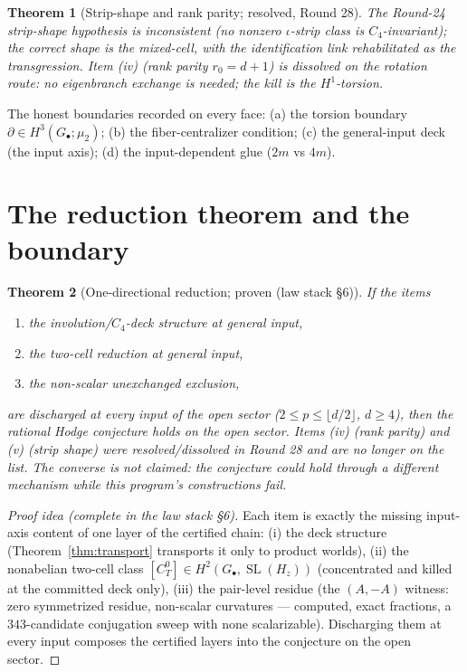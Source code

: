\documentclass[11pt]{article}
\newtheorem{theorem}{Theorem}[section]
\begin{document}
\begin{theorem}[Strip-shape and rank parity; resolved, Round 28]
The Round-24 strip-shape hypothesis is inconsistent (no nonzero
$\iota$-strip class is $C_4$-invariant); the correct shape is the
mixed-cell, with the identification link rehabilitated as the
transgression. Item (iv) (rank parity $r_0=d+1$) is dissolved on the
rotation route: no eigenbranch exchange is needed; the kill is the
$H^1$-torsion.
\end{theorem}

The honest boundaries recorded on every face: (a) the torsion boundary
$\partial\in H^3(G_\bullet;\mu_2)$; (b) the fiber-centralizer condition;
(c) the general-input deck (the input axis); (d) the input-dependent glue
($2m$ vs $4m$).

\section{The reduction theorem and the boundary}\label{sec:reduction}

\begin{theorem}[One-directional reduction; proven (law stack §6)]\label{thm:reduction}
If the items
\begin{enumerate}
\item[(i)] the involution/$C_4$-deck structure at general input,
\item[(ii)] the two-cell reduction at general input,
\item[(iii)] the non-scalar unexchanged exclusion,
\end{enumerate}
are discharged at every input of the open sector
($2\le p\le\lfloor d/2\rfloor$, $d\ge4$), then the rational Hodge
conjecture holds on the open sector. Items (iv) (rank parity) and (v)
(strip shape) were resolved/dissolved in Round 28 and are no longer on the
list. The converse is \emph{not} claimed: the conjecture could hold through
a different mechanism while this program's constructions fail.
\end{theorem}

\begin{proof}[Proof idea (complete in the law stack §6)]
Each item is exactly the missing input-axis content of one layer of the
certified chain: (i) the deck structure (Theorem~\ref{thm:transport}
transports it only to product worlds), (ii) the nonabelian two-cell class
$[C_T^0]\in H^2(G_\bullet,\operatorname{SL}(H_z))$ (concentrated and killed
at the committed deck only), (iii) the pair-level residue (the
$(A,-A)$ witness: zero symmetrized residue, non-scalar curvatures ---
computed, exact fractions, a $343$-candidate conjugation sweep with none
scalarizable). Discharging them at every input composes the certified
layers into the conjecture on the open sector.
\end{proof}
\end{document}

